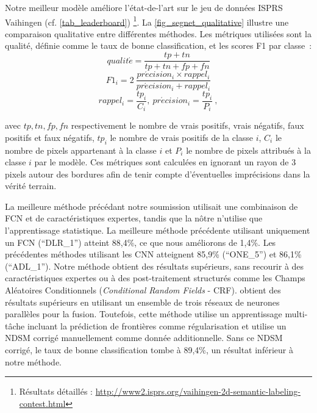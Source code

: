 Notre meilleur modèle améliore l'état-de-l'art sur le jeu de données ISPRS Vaihingen (cf. \cref{tab_leaderboard}) \footnote{Résultats détaillés : \url{http://www2.isprs.org/vaihingen-2d-semantic-labeling-contest.html}}. La \cref{fig_segnet_qualitative} illustre une comparaison qualitative entre différentes méthodes. Les métriques utilisées sont la qualité, définie comme le taux de bonne classification, et les scores F1 par classe~:
\begin{equation}
qualit\acute{e} = \frac{tp + tn}{tp + tn + fp + fn}
\end{equation}
\begin{equation}
F1_{i} = 2~\frac{pr\acute{e}cision_{i} \times rappel_{i}}{pr\acute{e}cision_{i} + rappel_{i}}
\end{equation}
\begin{equation}
rappel_i = \frac{tp_i}{C_i},~ pr\acute{e}cision_i = \frac{tp_i}{P_i}~,
\end{equation}

avec $tp, tn, fp, fn$ respectivement le nombre de vrais positifs, vrais négatifs, faux positifs et faux négatifs, $tp_i$ le nombre de vrais positifs de la classe $i$, $C_i$ le nombre de pixels appartenant à la classe $i$ et $P_i$ le nombre de pixels attribués à la classe $i$ par le modèle. Ces métriques sont calculées en ignorant un rayon de $3$ pixels autour des bordures afin de tenir compte d'éventuelles imprécisions dans la vérité terrain.

La meilleure méthode précédant notre soumission utilisait une combinaison de FCN et de caractéristiques expertes, tandis que la nôtre n'utilise que l'apprentissage statistique. La meilleure méthode précédente utilisant uniquement un FCN (``DLR\_1'') atteint 88,4\%, ce que nous améliorons de 1,4\%. Les précédentes méthodes utilisant les CNN atteignent 85,9\% (``ONE\_5''\cite{boulch_dag_2015}) et 86,1\% (``ADL\_1''\cite{paisitkriangkrai_effective_2015}). Notre méthode obtient des résultats supérieurs, sans recourir à des caractéristiques expertes ou à des post-traitement structurés comme les Champs Aléatoires Conditionnels ({\em Conditional Random Fields} - CRF). \cite{marmanis_classification_2017} obtient des résultats supérieurs en utilisant un ensemble de trois réseaux de neurones parallèles pour la fusion. Toutefois, cette méthode utilise un apprentissage multi-tâche incluant la prédiction de frontières comme régularisation et utilise un NDSM corrigé manuellement comme donnée additionnelle. Sans ce NDSM corrigé, le taux de bonne classification tombe à 89,4\%, un résultat inférieur à notre méthode.


